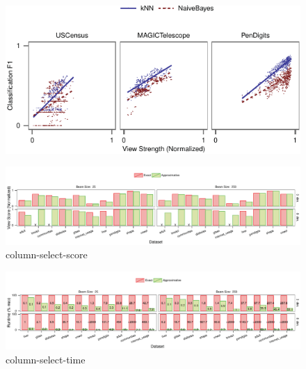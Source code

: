 \begin{figure}[t!]
\centering
\includegraphics[width=\columnwidth]{plots/compare-strength-f1}
\caption{}
\label{pic:strength-vs-f1}
\end{figure}

\begin{figure}[t!]
\centering
\includegraphics[width=2\columnwidth]{plots/column-select-score}
\caption{column-select-score}
\label{pic:column-select-score}
\end{figure}

\begin{figure}[t!]
\centering
\includegraphics[width=2\columnwidth]{plots/column-select-time}
\caption{column-select-time}
\label{pic:column-select-time}
\end{figure}

